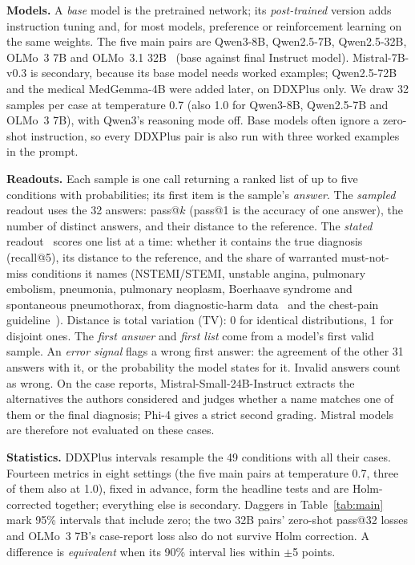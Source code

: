 \documentclass[letterpaper]{article} %
\begin{document}
\textbf{Models.} A \emph{base} model is the pretrained network; its \emph{post-trained} version adds instruction tuning and, for most models, preference or reinforcement learning on the same weights. The five main pairs are Qwen3-8B, Qwen2.5-7B, Qwen2.5-32B, OLMo~3 7B and OLMo~3.1 32B~\citep{olmo2025olmo3} (base against final Instruct model). Mistral-7B-v0.3 is secondary, because its base model needs worked examples; Qwen2.5-72B and the medical MedGemma-4B were added later, on DDXPlus only. We draw 32 samples per case at temperature 0.7 (also 1.0 for Qwen3-8B, Qwen2.5-7B and OLMo~3 7B), with Qwen3's reasoning mode off. Base models often ignore a zero-shot instruction, so every DDXPlus pair is also run with three worked examples in the prompt.

\textbf{Readouts.} Each sample is one call returning a ranked list of up to five conditions with probabilities; its first item is the sample's \emph{answer}. The \emph{sampled} readout uses the 32 answers: pass@$k$ (pass@1 is the accuracy of one answer), the number of distinct answers, and their distance to the reference. The \emph{stated} readout~\citep{tian2023justask} scores one list at a time: whether it contains the true diagnosis (recall@5), its distance to the reference, and the share of warranted must-not-miss conditions it names (NSTEMI/STEMI, unstable angina, pulmonary embolism, pneumonia, pulmonary neoplasm, Boerhaave syndrome and spontaneous pneumothorax, from diagnostic-harm data~\citep{newmantoker2024burden} and the chest-pain guideline~\citep{gulati2021chestpain}). Distance is total variation (TV): 0 for identical distributions, 1 for disjoint ones. The \emph{first answer} and \emph{first list} come from a model's first valid sample. An \emph{error signal} flags a wrong first answer: the agreement of the other 31 answers with it, or the probability the model states for it. Invalid answers count as wrong. On the case reports, Mistral-Small-24B-Instruct extracts the alternatives the authors considered and judges whether a name matches one of them or the final diagnosis; Phi-4 gives a strict second grading. Mistral models are therefore not evaluated on these cases.

\textbf{Statistics.} DDXPlus intervals resample the 49 conditions with all their cases. Fourteen metrics in eight settings (the five main pairs at temperature 0.7, three of them also at 1.0), fixed in advance, form the headline tests and are Holm-corrected together; everything else is secondary. Daggers in Table~\ref{tab:main} mark 95\% intervals that include zero; the two 32B pairs' zero-shot pass@32 losses and OLMo~3 7B's case-report loss also do not survive Holm correction. A difference is \emph{equivalent} when its 90\% interval lies within $\pm$5 points.
\end{document}
